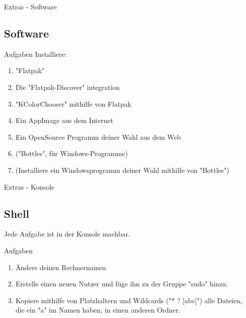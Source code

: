 \begin{frame}{Extras - Software}
    \subsection{Software}\label{subsec:software}

    \begin{alertblock}{Aufgaben}
        \pause
        Installiere:\pause
        \begin{enumerate}
            \item "Flatpak"\pause
            \item Die "Flatpak-Discover" integration\pause
            \item "KColorChooser" mithilfe von Flatpak\pause
            \item Ein AppImage aus dem Internet\pause
            \item Ein OpenSource Programm deiner Wahl aus dem Web\pause
            \item ("Bottles", für Windows-Programme)\pause
            \item (Installiere ein Windowsprogramm deiner Wahl mithilfe von "Bottles")
        \end{enumerate}

    \end{alertblock}

\end{frame}


\begin{frame}{Extras - Konsole}
    \subsection{Shell}\label{subsec:shell}
    \pause
    Jede Aufgabe ist in der Konsole machbar.
    \pause
    \vspace{0.5cm}
    \begin{alertblock}{Aufgaben}
        \begin{enumerate}\pause
            \item Ändere deinen Rechnernamen\pause
            \item Erstelle einen neuen Nutzer und füge ihn zu der Gruppe "sudo" hinzu.\pause
            \item Kopiere mithilfe von Platzhaltern und Wildcards ("* ? [abc]") alle Dateien, die ein "a" im Namen haben, in einen anderen Ordner.
        \end{enumerate}
    \end{alertblock}

\end{frame}


